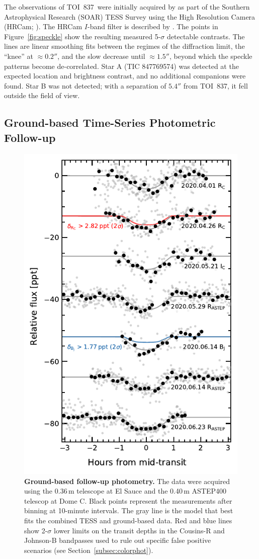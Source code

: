 \documentclass[12pt,twocolumn,tighten]{aastex63}
\newcommand{\tn}{TOI~837} %
\begin{document}
The observations of \tn\ were initially acquired by
\citet{ziegler_soar_2020} as part of the Southern Astrophysical
Research (SOAR) TESS Survey using the High Resolution Camera (HRCam;
\citealt{tokovinin_ten_2018}).  The HRCam $I$-band filter is described
by \citet{tokovinin_ten_2018}.  The points in Figure~\ref{fig:speckle}
show the resulting measured 5-$\sigma$ detectable contrasts.  The
lines are linear smoothing fits between the regimes of the diffraction
limit, the ``knee'' at $\approx 0.2''$, and the slow decrease until
$\approx 1.5''$, beyond which the speckle patterns become
de-correlated.  Star A (TIC 847769574) was detected at the expected
location and brightness contrast, and no additional companions were
found.  Star B was not detected; with a separation of $5.4''$ from
\tn, it fell outside the field of view.




\subsection{Ground-based Time-Series Photometric Follow-up}
\label{subsec:groundphot}


\begin{figure}[!t]
	\begin{center}
		\leavevmode
		\includegraphics[width=.49\textwidth]{f2b.pdf}
	\end{center}
	\vspace{-0.7cm}
	\caption{
    {\bf Ground-based follow-up photometry.} The data were acquired
    using the 0.36$\,$m telescope at El Sauce and the 0.40$\,$m
    ASTEP400 telescop at Dome C.  Black points represent the
    measurements after binning at 10-minute intervals. The gray line
    is the model that best fits the combined TESS and ground-based
    data.  Red and blue lines show 2-$\sigma$ lower limits on the
    transit depths in the Cousins-R and Johnson-B bandpasses used to
    rule out specific false positive scenarios (see
    Section~\ref{subsec:colorphot}).
		\label{fig:groundphot}
	}
\end{figure}
\end{document}
